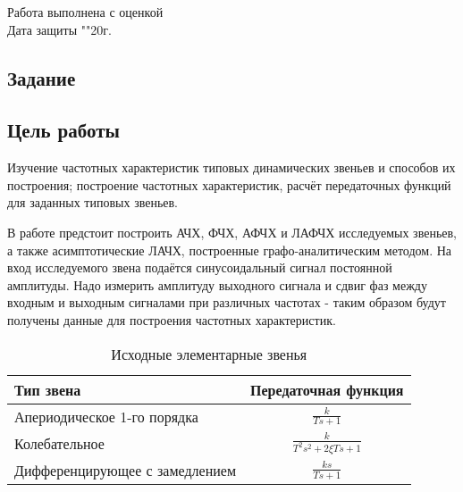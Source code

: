 \documentclass[a4paper, 12pt]{article}
\begin{document}
\begin{titlepage}
		Работа выполнена с оценкой \hspace{1cm} \underline{\hspace{8cm}} \\ 
		\vspace{1cm}
		Дата защиты "\underline{\hspace{0.7cm}}"\hspace{0.2cm}\underline{\hspace{2cm}}\hspace{0.2cm}20\underline{\hspace{0.7cm}}г.

\end{titlepage}

\begin{center}
\section*{Задание}
\end{center}

\subsection*{Цель работы} 
\par
Изучение частотных характеристик типовых динамических звеньев и способов их построения; построение частотных характеристик, расчёт передаточных функций для заданных типовых звеньев.
\par
В работе предстоит построить АЧХ, ФЧХ, АФЧХ и ЛАФЧХ исследуемых звеньев, а также асимптотические ЛАЧХ, построенные графо-аналитическим методом. На вход исследуемого звена подаётся синусоидальный сигнал постоянной амплитуды. Надо измерить амплитуду выходного сигнала и сдвиг фаз между входным и выходным сигналами при различных частотах - таким образом будут получены данные для построения частотных характеристик. 

\begin{table}[h!]
    \centering
    \begin{threeparttable}
    	\caption{Исходные элементарные звенья}
    	\begin{tabular} {|l|c|}
        \hline
        	Тип звена & Передаточная функция \\ [0.5cm]  \hline
        	Апериодическое 1-го порядка & $\displaystyle\frac{k}{Ts + 1}$ \\ [0.5cm]  \hline
        	Колебательное & $\displaystyle\frac{k}{T^2s^2+2\xi Ts+1}$ \\ [0.5cm]  \hline
        	Дифференцирующее с замедлением & $\displaystyle\frac{ks}{Ts+ 1}$ \\ [0.5cm] \hline
    	\end{tabular}
    \end{threeparttable} 
\end{table}
\end{document}

